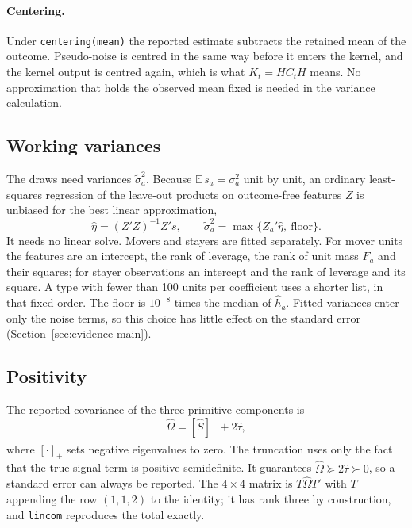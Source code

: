 \documentclass[11pt]{article}
\newcommand{\E}{\mathbb{E}}
\begin{document}
\paragraph{Centering.} Under \texttt{centering(mean)} the reported estimate
subtracts the retained mean of the outcome. Pseudo-noise is centred in the
same way before it enters the kernel, and the kernel output is centred again,
which is what $K_t=HC_tH$ means. No approximation that holds the observed mean
fixed is needed in the variance calculation.

\subsection{Working variances}\label{sec:working}

The draws need variances $\tilde\sigma_a^2$. Because $\E\,s_a=\sigma_a^2$
unit by unit, an ordinary least-squares regression of the leave-out products
on outcome-free features $Z$ is unbiased for the best linear approximation,
\begin{equation}\label{eq:working}
 \hat\eta=(Z'Z)^{-1}Z's,\qquad
 \tilde\sigma_a^2=\max\{Z_a'\hat\eta,\ \text{floor}\}.
\end{equation}
It needs no linear solve. Movers and stayers are fitted separately. For
mover units the features are an intercept, the rank of leverage, the rank of
unit mass $F_a$ and their squares; for stayer observations an intercept and
the rank of leverage and its square. A type with fewer than 100 units per
coefficient uses a shorter list, in that fixed order. The floor is $10^{-8}$
times the median of $\hat h_a$. Fitted variances enter only the noise terms,
so this choice has little effect on the standard error
(Section~\ref{sec:evidence-main}).

\subsection{Positivity}

The reported covariance of the three primitive components is
\begin{equation}\label{eq:final}
 \hat\Omega=[\hat S]_+ +2\hat\tau ,
\end{equation}
where $[\cdot]_+$ sets negative eigenvalues to zero. The truncation uses only
the fact that the true signal term is positive semidefinite. It guarantees
$\hat\Omega\succeq2\hat\tau\succ0$, so a standard error can always be
reported. The $4\times4$ matrix is $T\hat\Omega T'$ with $T$ appending the
row $(1,1,2)$ to the identity; it has rank three by construction, and
\texttt{lincom} reproduces the total exactly.
\end{document}
